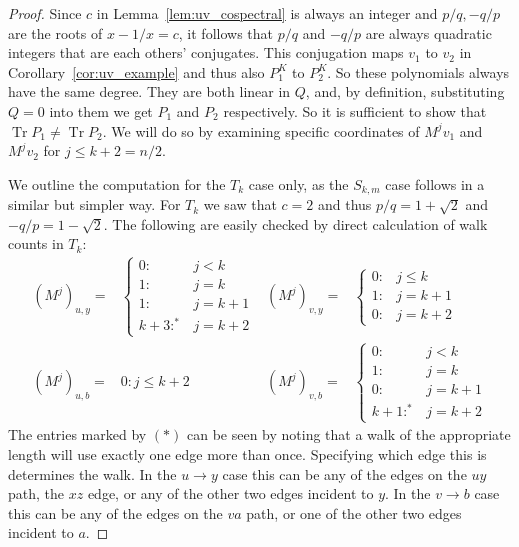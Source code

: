 \documentclass[11pt]{article}
\theoremstyle{definition}
\numberwithin{equation}{section}
\newcommand\+{\mkern2mu}
\newcommand{\1}{\mathbf 1}
\DeclareMathOperator{\Tr}{Tr}
\begin{document}
\begin{proof}
Since $c$ in Lemma~\ref{lem:uv_cospectral} is always an integer and $p/q, -q/p$ are the roots of $x-1/x= c$, it follows that $p/q$ and $-q/p$ are always quadratic integers that are each others' conjugates. This conjugation maps $v_1$ to $v_2$ in Corollary~\ref{cor:uv_example} and thus also $P^K_1$ to $P^K_2$. So these polynomials always have the same degree. They are both linear in $Q$, and, by definition, substituting $Q=0$ into them we get $P_1$ and $P_2$ respectively. So it is sufficient to show that $\Tr P_1 \neq \Tr P_2$. We will do so by examining specific coordinates of $M^j v_1$ and $M^j v_2$ for $j \leq k+2 = n/2$. 

We outline the computation for the $T_k$ case only, as the $S_{k,m}$ case follows in a similar but simpler way. For $T_k$ we saw that $c=2$ and thus $p/q = 1+\sqrt{2}$ and $-q/p = 1-\sqrt{2}$. The following are easily checked by direct calculation of walk counts in $T_k$:
\begin{align*}
(M^j)_{u,y} =& \left\{ \begin{array}{cl} 0 :& j < k \\ 1:& j=k \\ 1 :& j= k+1 \\ k+3 :^*& j =k+2 \end{array} \right. &
(M^j)_{v,y} =& \left\{ \begin{array}{cl} 0 :& j \leq k \\ 1 :& j= k+1 \\ 0 :& j =k+2 \end{array} \right. \\
(M^j)_{u,b} =& 0 : j \leq k+2 &
(M^j)_{v,b} =& \left\{ \begin{array}{cl} 0 :& j < k \\ 1:& j=k \\ 0 :& j= k+1 \\ k+1 :^*& j =k+2 \end{array} \right. 
\end{align*}
The entries marked by $(*)$ can be seen by noting that a walk of the appropriate length will use exactly one edge more than once. Specifying which edge this is determines the walk. In the $u \to y$ case this can be any of the edges on the $uy$ path, the $xz$ edge, or any of the other two edges incident to $y$. In the $v \to b$ case this can be any of the edges on the $va$ path, or one of the other two edges incident to $a$. 


\end{proof}
\end{document}
